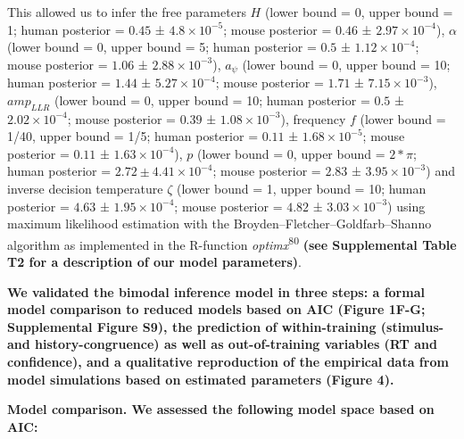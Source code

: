 \documentclass[
]{article}
\begin{document}
This allowed us to infer the free parameters \(H\) (lower bound = 0,
upper bound = 1; human posterior = \(0.45\) ±
\(\ensuremath{4.8\times 10^{-5}}\); mouse posterior = \(0.46\) ±
\(\ensuremath{2.97\times 10^{-4}}\)), \(\alpha\) (lower bound = 0, upper
bound = 5; human posterior = \(0.5\) ±
\(\ensuremath{1.12\times 10^{-4}}\); mouse posterior = \(1.06\) ±
\(\ensuremath{2.88\times 10^{-3}}\)), \(a_{\psi}\) (lower bound = 0,
upper bound = 10; human posterior = \(1.44\) ±
\(\ensuremath{5.27\times 10^{-4}}\); mouse posterior = \(1.71\) ±
\(\ensuremath{7.15\times 10^{-3}}\)), \(amp_{LLR}\) (lower bound = 0,
upper bound = 10; human posterior = \(0.5\) ±
\(\ensuremath{2.02\times 10^{-4}}\); mouse posterior = \(0.39\) ±
\(\ensuremath{1.08\times 10^{-3}}\)), frequency \(f\) (lower bound =
1/40, upper bound = 1/5; human posterior = \(0.11\) ±
\(\ensuremath{1.68\times 10^{-5}}\); mouse posterior = \(0.11\) ±
\(\ensuremath{1.63\times 10^{-4}}\)), \(p\) (lower bound = 0, upper
bound = \(2*\pi\); human posterior =
\(2.72 ± \ensuremath{4.41\times 10^{-4}}\); mouse posterior = \(2.83\) ±
\(\ensuremath{3.95\times 10^{-3}}\)) and inverse decision temperature
\(\zeta\) (lower bound = 1, upper bound = 10; human posterior = \(4.63\)
± \(\ensuremath{1.95\times 10^{-4}}\); mouse posterior = \(4.82\) ±
\(\ensuremath{3.03\times 10^{-3}}\)) using maximum likelihood estimation
with the Broyden--Fletcher--Goldfarb--Shanno algorithm as implemented in
the R-function \emph{optimx}\textsuperscript{80} \textbf{(see
Supplemental Table T2 for a description of our model parameters)}.

\textbf{We validated the bimodal inference model in three steps: a
formal model comparison to reduced models based on AIC (Figure 1F-G;
Supplemental Figure S9), the prediction of within-training (stimulus-
and history-congruence) as well as out-of-training variables (RT and
confidence), and a qualitative reproduction of the empirical data from
model simulations based on estimated parameters (Figure 4).}

\textbf{Model comparison. We assessed the following model space based on
AIC:}
\end{document}
